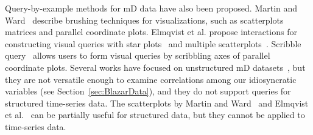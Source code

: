 Query-by-example methods for mD data have also been proposed.
Martin and Ward~\cite{Martin2005} describe brushing techniques for visualizations,
such as scatterplots matrices and parallel coordinate plots.
Elmqvist et al. propose interactions for constructing visual queries with star plots~\cite{Elmqvist2007} and multiple scatterplots~\cite{Elmqvist2008}.
Scribble query~\cite{Nielsen2016} allows users to form visual queries by scribbling axes of parallel coordinate plots.
Several works have focused on unstructured mD datasets~\cite{Martin2005,Elmqvist2007,Nielsen2016}, 
but they are not versatile enough to examine correlations among our idiosyncratic variables (see Section~\ref{sec:BlazarData}), and they do not support queries for structured time-series data.
The scatterplots by Martin and Ward~\cite{Martin2005} and Elmqvist et al.~\cite{Elmqvist2008} can be partially useful for structured data, but they cannot be applied to time-series data.

